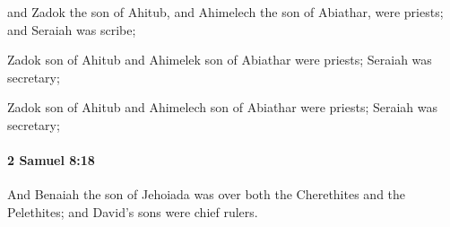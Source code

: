 			\begin{versebox}
					\item[BHS] 
					\item[ASV] and Zadok the son of Ahitub, and Ahimelech the son of Abiathar, were priests; and Seraiah was scribe;
					\item[NIV] Zadok son of Ahitub and Ahimelek son of Abiathar were priests; Seraiah was secretary;
					\item[NRSV] Zadok son of Ahitub and Ahimelech son of Abiathar were priests; Seraiah was secretary;
			\end{versebox}

		\paragraph{2 Samuel 8:18} %
			\label{2SAMUEL-8-18}

			And Benaiah the son of Jehoiada was over both the Cherethites and the Pelethites; and David’s sons were chief rulers.

